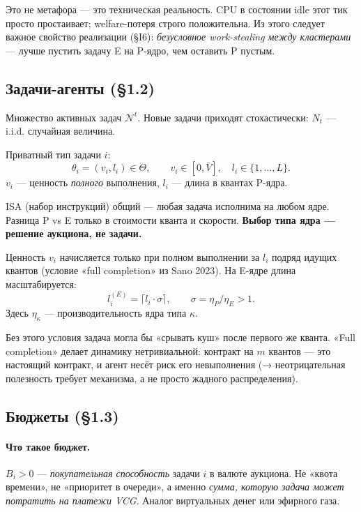 \documentclass[11pt,a4paper]{article}
\begin{document}
\begin{why}
Это не метафора — это техническая реальность. CPU в состоянии idle
этот тик просто простаивает; welfare-потеря строго положительна.
Из этого следует важное свойство реализации (§I6): \emph{безусловное
work-stealing между кластерами} — лучше пустить задачу E на P-ядро, чем
оставить P пустым.
\end{why}

\subsection{Задачи-агенты (§1.2)}

Множество активных задач $\mathcal{N}^t$. Новые задачи приходят
стохастически: $N_t$ — i.i.d. случайная величина.

Приватный тип задачи $i$:
\[
\theta_i = (v_i, l_i) \in \Theta,\qquad
v_i \in [0,\bar V],\quad l_i \in \{1,\ldots,L\}.
\]
$v_i$ — ценность \emph{полного} выполнения, $l_i$ — длина в квантах
P-ядра.

ISA (набор инструкций) общий — любая задача исполнима на любом ядре.
Разница P vs E только в стоимости кванта и скорости. \textbf{Выбор
типа ядра — решение аукциона, не задачи.}

Ценность $v_i$ начисляется только при полном выполнении за $l_i$
подряд идущих квантов (условие «full completion» из Sano 2023). На
E-ядре длина масштабируется:
\[
l_i^{(E)} = \lceil l_i \cdot \sigma \rceil,\qquad
\sigma = \eta_P/\eta_E > 1.
\]
Здесь $\eta_\kappa$ — производительность ядра типа $\kappa$.

\begin{why}
Без этого условия задача могла бы «срывать куш» после первого же
кванта. «Full completion» делает динамику нетривиальной: контракт
на $m$ квантов — это настоящий контракт, и агент несёт риск его
невыполнения (→ неотрицательная полезность требует механизма, а не
просто жадного распределения).
\end{why}

\subsection{Бюджеты (§1.3)}

\paragraph{Что такое бюджет.}
$B_i>0$ — \emph{покупательная способность} задачи $i$ в валюте
аукциона. Не «квота времени», не «приоритет в очереди», а именно
\emph{сумма, которую задача может потратить на платежи VCG}. Аналог
виртуальных денег или эфирного газа.
\end{document}

